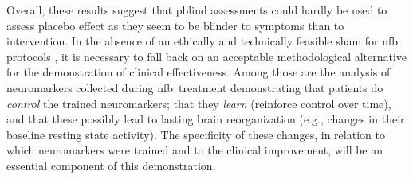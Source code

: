 Overall, these results suggest that \gls{pblind} assessments could hardly be used to assess placebo effect as they seem to be blinder 
to symptoms than to intervention. In the absence of an ethically \citep{Holtmann2014} and technically \citep{Birbaumer1991} feasible sham 
for \gls{nfb} protocols \citep{World-Medical-Association2000}, it is necessary to fall back on an acceptable methodological alternative for 
the demonstration of clinical effectiveness. Among those are the analysis of neuromarkers collected during \gls{nfb} treatment demonstrating 
that patients do \emph{control} the trained neuromarkers; that they \emph{learn} (reinforce control over time), and that these possibly 
lead to lasting brain reorganization (e.g., changes in their baseline resting state activity). The specificity of these changes, in relation 
to which neuromarkers were trained and to the clinical improvement, will be an essential component of this demonstration.  

